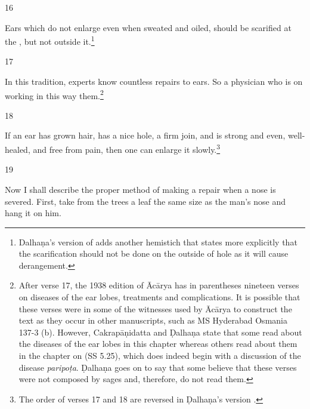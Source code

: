 \begin{translation}
\item[16]
        \begin{sloka}
Ears which do not enlarge even when sweated and oiled,  should be scarified  at the
, but not outside it.\footnote{Dalhaṇa's version of
     adds another hemistich that states more explicitly that the
    scarification should not be done on the outside of hole as it will cause
    derangement.}
        \end{sloka}
    
\item[17]
          \begin{sloka}
    In this tradition, experts know countless repairs to ears.  So a 
    physician who is  on working in this way 
     them.\footnote{After verse 17, the 1938 edition of Ācārya \citep[80]{vulgate} has in parentheses nineteen verses on diseases of the ear lobes, treatments and complications. It is possible that these verses were in some of the witnesses used by Ācārya to construct the text as they occur in other manuscripts, such as  MS Hyderabad Osmania 137-3 (b). However, Cakrapāṇidatta \citep[132]{acar-1939} and Ḍalhaṇa \citep[80]{vulgate} state that some read about the diseases of the ear lobes in this chapter whereas others read about them in the chapter on  (SS 5.25), which does indeed begin with a discussion of the disease \emph{paripoṭa}.  Ḍalhaṇa goes on to say that some believe that these verses were not composed by sages and, therefore, do not read them.}
        \end{sloka}
    
\item[18]
           \begin{sloka}
    If an ear has grown hair, has a nice hole, a firm join, and is strong and
    even, well-healed, and free from pain, then one can enlarge it slowly.\footnote{The order of verses 17 and 18 are reversed in Ḍalhaṇa's version \citep[80]{vulgate}.}
        \end{sloka}
    
\item[19]
    
   \begin{sloka}
        Now I shall describe the proper method of making a repair when a nose is severed.
    First, take from the trees a leaf the same size as the man's nose and hang it
    on him. 
   \end{sloka}
    

\end{translation}
